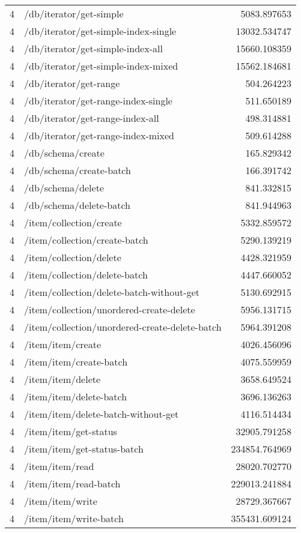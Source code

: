 \begin{longtable}{rlr}
4 & /db/iterator/get-simple & 5083.897653 \\
4 & /db/iterator/get-simple-index-single & 13032.534747 \\
4 & /db/iterator/get-simple-index-all & 15660.108359 \\
4 & /db/iterator/get-simple-index-mixed & 15562.184681 \\
4 & /db/iterator/get-range & 504.264223 \\
4 & /db/iterator/get-range-index-single & 511.650189 \\
4 & /db/iterator/get-range-index-all & 498.314881 \\
4 & /db/iterator/get-range-index-mixed & 509.614288 \\
4 & /db/schema/create & 165.829342 \\
4 & /db/schema/create-batch & 166.391742 \\
4 & /db/schema/delete & 841.332815 \\
4 & /db/schema/delete-batch & 841.944963 \\
4 & /item/collection/create & 5332.859572 \\
4 & /item/collection/create-batch & 5290.139219 \\
4 & /item/collection/delete & 4428.321959 \\
4 & /item/collection/delete-batch & 4447.660052 \\
4 & /item/collection/delete-batch-without-get & 5130.692915 \\
4 & /item/collection/unordered-create-delete & 5956.131715 \\
4 & /item/collection/unordered-create-delete-batch & 5964.391208 \\
4 & /item/item/create & 4026.456096 \\
4 & /item/item/create-batch & 4075.559959 \\
4 & /item/item/delete & 3658.649524 \\
4 & /item/item/delete-batch & 3696.136263 \\
4 & /item/item/delete-batch-without-get & 4116.514434 \\
4 & /item/item/get-status & 32905.791258 \\
4 & /item/item/get-status-batch & 234854.764969 \\
4 & /item/item/read & 28020.702770 \\
4 & /item/item/read-batch & 229013.241884 \\
4 & /item/item/write & 28729.367667 \\
4 & /item/item/write-batch & 355431.609124 \\

\end{longtable}
